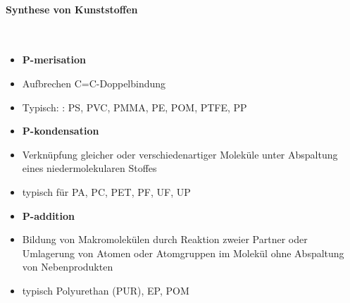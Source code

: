 \documentclass[12pt,twocolumn]{article}
\begin{document}
    \paragraph{Synthese von Kunststoffen}\mbox{}\\
    \begin{minipage}[t]{0.32\columnwidth}
        \begin{itemize}[label={}, leftmargin=*, itemsep=0.01em]
            \item \textbf{P-merisation}
            \item Aufbrechen C=C-Doppelbindung 
            \item Typisch: : PS, PVC, PMMA, PE, POM, PTFE, PP
        \end{itemize}
    \end{minipage}\hfill
    \begin{minipage}[t]{0.32\columnwidth}
        \begin{itemize}[label={}, leftmargin=*,  itemsep=0.01em]
            \item \textbf{P-kondensation}
            \item Verknüpfung gleicher oder verschiedenartiger Moleküle unter
            Abspaltung eines niedermolekularen Stoffes
            \item typisch für PA, PC, PET, PF, UF, UP
        \end{itemize} 
    \end{minipage}\hfill
    \begin{minipage}[t]{0.32\columnwidth}
        \begin{itemize}[label={}, leftmargin=*, itemsep=0.01em]
            \item \textbf{P-addition}
            \item Bildung von Makromolekülen durch Reaktion zweier Partner oder
            Umlagerung von Atomen oder Atomgruppen im Molekül ohne Abspaltung
            von Nebenprodukten
            \item typisch Polyurethan (PUR), EP, POM
        \end{itemize}
    \end{minipage}\hfill
\end{document}
